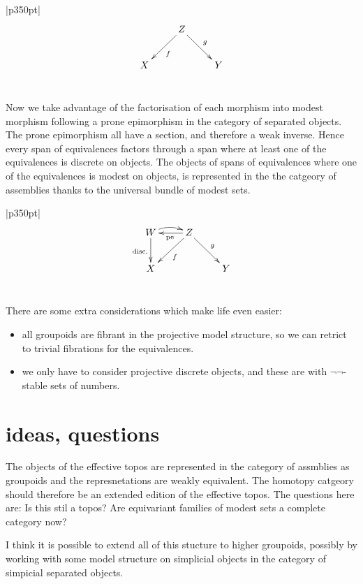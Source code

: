 \documentclass[12pt,a4paper]{article}
\theoremstyle{definition}
\newenvironment{blackboard}{\begin{tabular}{|p{350pt}|}\hline} {\\ \hline \end{tabular} }
\begin{document}
\begin{blackboard}
\[\xymatrix{ & Z\ar[dl]^f\ar[dr]^g \\ X&& Y }\] 
\end{blackboard}

Now we take advantage of the factorisation of each morphism into modest morphism following a prone epimorphism in the category of separated objects. The prone epimorphism all have a section, and therefore a weak inverse. Hence every span of equivalences factors through a span where at least one of the equivalences is discrete on objects. The objects of spans of equivalences where one of the equivalences is modest on objects, is represented in the the catgeory of assemblies thanks to the universal bundle of modest sets.

\begin{blackboard}
\[\xymatrix{ W\ar[d]_{\textrm{disc.}}\ar@/^/[r] & Z\ar[l]^{\textrm{pe}}\ar[dl]^f\ar[dr]^g \\ X&& Y }\] 
\end{blackboard}

There are some extra considerations which make life even easier:
\begin{itemize}
\item all groupoids are fibrant in the projective model structure, so we can retrict to trivial fibrations for the equivalences.
\item we only have to consider projective discrete objects, and these are with $\neg\neg$-stable sets of numbers.
\end{itemize}


\section{ideas, questions}
The objects of the effective topos are represented in the category of assmblies as groupoids and the represnetations are weakly equivalent. The homotopy catgeory should therefore be an extended edition of the effective topos. The questions here are: Is this stil a topos? Are equivariant families of modest sets a complete category now?

I think it is possible to extend all of this stucture to higher groupoids, possibly by working with some model structure on simplicial objects in the category of simpicial separated objects.
\end{document}
